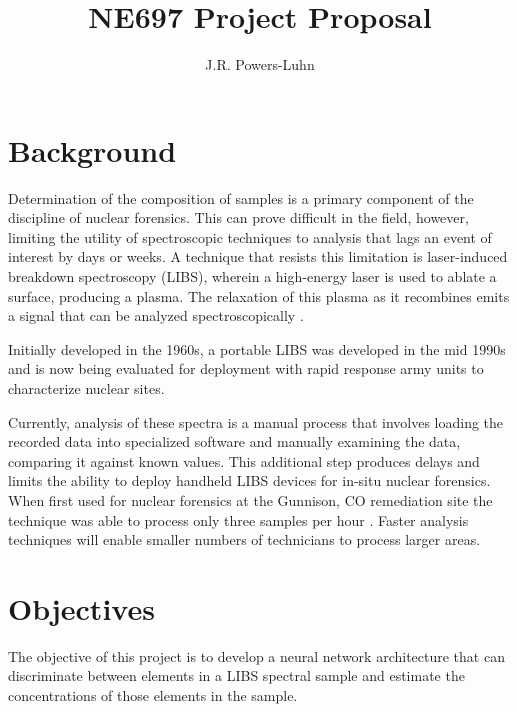 \documentclass{article}
\begin{document}
\title{NE697 Project Proposal}
\begin{comment}
\author{
	\IEEEauthorblockN{J.R. Powers-Luhn}
	\IEEEauthorblockA{
		Department of Nuclear Engineering\\
		University of Tennessee\\
		1004 Estabrook Rd\\
		Knoxville, TN 37996\\
		Email: jpowersl@vols.utk.edu
	}
}
\end{comment}

\author{J.R. Powers-Luhn}

\maketitle

\section{Background}
Determination of the composition of samples is a primary component of the discipline of nuclear forensics. This can prove difficult in the field, however, limiting the utility of spectroscopic techniques to analysis that lags an event of interest by days or weeks. A technique that resists this limitation is laser-induced breakdown spectroscopy (LIBS), wherein a high-energy laser is used to ablate a surface, producing a plasma. The relaxation of this plasma as it recombines emits a signal that can be analyzed spectroscopically \cite{miziolek2006laser}.

Initially developed in the 1960s, a portable LIBS was developed in the mid 1990s and is now being evaluated for deployment with rapid response army units to characterize nuclear sites. 

Currently, analysis of these spectra is a manual process that involves loading the recorded data into specialized software and manually examining the data, comparing it against known values. This additional step produces delays and limits the ability to deploy handheld LIBS devices for in-situ nuclear forensics. When first used for nuclear forensics at the Gunnison, CO remediation site the technique was able to process only three samples per hour \cite{anderson1994laser}. Faster analysis techniques will enable smaller numbers of technicians to process larger areas.

\section{Objectives}
The objective of this project is to develop a neural network architecture that can discriminate between elements in a LIBS spectral sample and estimate the concentrations of those elements in the sample.
\end{document}
